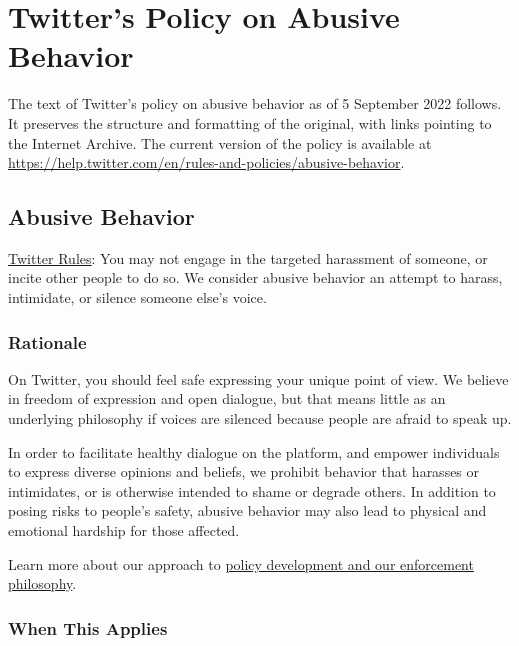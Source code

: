 
\newpage
\section{Twitter's Policy on Abusive Behavior}
\label{adx:twitter:abusive-behavior}

The text of Twitter's policy on abusive behavior as of 5 September 2022 follows.
It preserves the structure and formatting of the original, with links pointing
to the Internet Archive. The current version of the policy is available at
\url{https://help.twitter.com/en/rules-and-policies/abusive-behavior}.


\subsection{Abusive Behavior}

\noindent\href{https://web.archive.org/web/20220905021323/https://help.twitter.com/en/rules-and-policies/twitter-rules.html}{Twitter
Rules}: You may not engage in the targeted harassment of someone, or incite
other people to do so. We consider abusive behavior an attempt to harass,
intimidate, or silence someone else's voice.


\subsubsection{Rationale}

On Twitter, you should feel safe expressing your unique point of view. We
believe in freedom of expression and open dialogue, but that means little as an
underlying philosophy if voices are silenced because people are afraid to speak
up.

In order to facilitate healthy dialogue on the platform, and empower individuals
to express diverse opinions and beliefs, we prohibit behavior that harasses or
intimidates, or is otherwise intended to shame or degrade others. In addition to
posing risks to people's safety, abusive behavior may also lead to physical and
emotional hardship for those affected.

Learn more about our approach to
\href{https://web.archive.org/web/20220905021323/https://help.twitter.com/en/rules-and-policies/enforcement-philosophy.html}{policy
development and our enforcement philosophy}.


\subsubsection{When This Applies}

